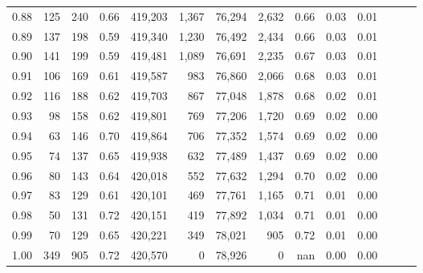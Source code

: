 \begin{tabular}{rrrrrrrrrrrrrr}
0.88 &     125 &    240 &  0.66 &  419,203 &    1,367 &  76,294 &   2,632 &  0.66 &  0.03 &      0.01 \\
0.89 &     137 &    198 &  0.59 &  419,340 &    1,230 &  76,492 &   2,434 &  0.66 &  0.03 &      0.01 \\
0.90 &     141 &    199 &  0.59 &  419,481 &    1,089 &  76,691 &   2,235 &  0.67 &  0.03 &      0.01 \\
0.91 &     106 &    169 &  0.61 &  419,587 &      983 &  76,860 &   2,066 &  0.68 &  0.03 &      0.01 \\
0.92 &     116 &    188 &  0.62 &  419,703 &      867 &  77,048 &   1,878 &  0.68 &  0.02 &      0.01 \\
0.93 &      98 &    158 &  0.62 &  419,801 &      769 &  77,206 &   1,720 &  0.69 &  0.02 &      0.00 \\
0.94 &      63 &    146 &  0.70 &  419,864 &      706 &  77,352 &   1,574 &  0.69 &  0.02 &      0.00 \\
0.95 &      74 &    137 &  0.65 &  419,938 &      632 &  77,489 &   1,437 &  0.69 &  0.02 &      0.00 \\
0.96 &      80 &    143 &  0.64 &  420,018 &      552 &  77,632 &   1,294 &  0.70 &  0.02 &      0.00 \\
0.97 &      83 &    129 &  0.61 &  420,101 &      469 &  77,761 &   1,165 &  0.71 &  0.01 &      0.00 \\
0.98 &      50 &    131 &  0.72 &  420,151 &      419 &  77,892 &   1,034 &  0.71 &  0.01 &      0.00 \\
0.99 &      70 &    129 &  0.65 &  420,221 &      349 &  78,021 &     905 &  0.72 &  0.01 &      0.00 \\
1.00 &     349 &    905 &  0.72 &  420,570 &        0 &  78,926 &       0 &   nan &  0.00 &      0.00 \\
\bottomrule
\end{tabular}
